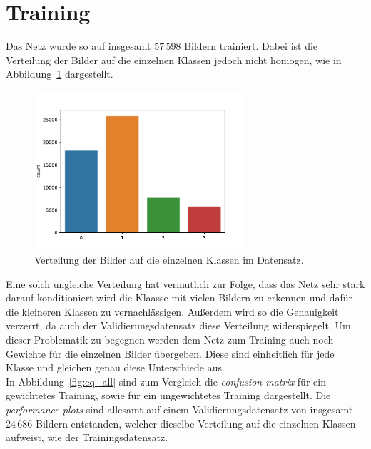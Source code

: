 \section{Training}
%
Das Netz wurde so auf insgesamt $57\,598$ Bildern trainiert. Dabei ist die
Verteilung der Bilder auf die einzelnen Klassen jedoch nicht homogen, wie in
Abbildung~\ref{fig:count} dargestellt.
%
\begin{figure}
  \centering
  \includegraphics[width=0.7\textwidth]{Plots/countplot_smaller.pdf}
  \caption{Verteilung der Bilder auf die einzelnen Klassen im Datensatz.}
  \label{fig:count}
\end{figure}
%
Eine solch ungleiche Verteilung hat vermutlich zur Folge, dass das Netz sehr
stark darauf konditioniert wird die Klaasse mit vielen Bildern zu erkennen und
dafür die kleineren Klassen zu vernachlässigen. Außerdem wird so die
Genauigkeit verzerrt, da auch der Validierungsdatensatz diese Verteilung
widerspiegelt. Um dieser Problematik zu begegnen werden dem Netz zum Training
auch noch Gewichte für die einzelnen Bilder übergeben. Diese sind einheitlich
für jede Klasse und gleichen genau diese Unterschiede aus. \\
In Abbildung~\ref{fig:eq_all} sind zum Vergleich die \textit{confusion matrix}
für ein gewichtetes Training, sowie für ein ungewichtetes Training dargestellt.
Die \textit{performance plots} sind allesamt auf einem Validierungsdatensatz
von insgesamt $24\,686$ Bildern entstanden, welcher dieselbe Verteilung auf
die einzelnen Klassen aufweist, wie der Trainingsdatensatz.
%

